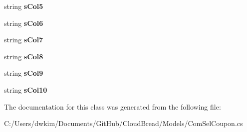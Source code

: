 \begin{DoxyCompactItemize}
\item 
string {\bfseries s\+Col5}\hypertarget{a00053_a88283212982c40a2d51ee1189e5c46a9}{}\label{a00053_a88283212982c40a2d51ee1189e5c46a9}

\item 
string {\bfseries s\+Col6}\hypertarget{a00053_a985115d7948f99b37a14629b5d693134}{}\label{a00053_a985115d7948f99b37a14629b5d693134}

\item 
string {\bfseries s\+Col7}\hypertarget{a00053_ad6f1ac9d8bb15c3b9409968fc0790f18}{}\label{a00053_ad6f1ac9d8bb15c3b9409968fc0790f18}

\item 
string {\bfseries s\+Col8}\hypertarget{a00053_ac5ec526e4c6ecc30f14f4b610381766c}{}\label{a00053_ac5ec526e4c6ecc30f14f4b610381766c}

\item 
string {\bfseries s\+Col9}\hypertarget{a00053_a55f099620b1f456da66380b81519ab58}{}\label{a00053_a55f099620b1f456da66380b81519ab58}

\item 
string {\bfseries s\+Col10}\hypertarget{a00053_a1a250b08edb3f48e563ad79da831b833}{}\label{a00053_a1a250b08edb3f48e563ad79da831b833}

\end{DoxyCompactItemize}


The documentation for this class was generated from the following file\+:\begin{DoxyCompactItemize}
\item 
C\+:/\+Users/dwkim/\+Documents/\+Git\+Hub/\+Cloud\+Bread/\+Models/Com\+Sel\+Coupon.\+cs\end{DoxyCompactItemize}
